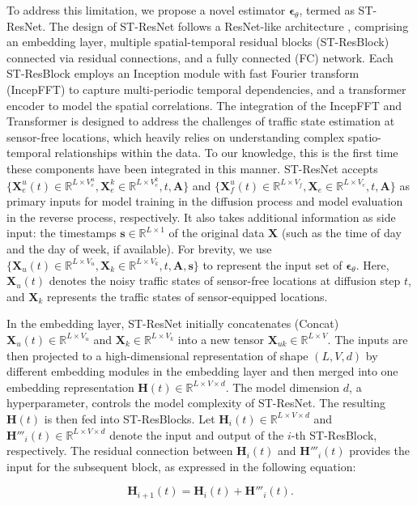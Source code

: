 \documentclass[a4paper,fleqn,12pt]{cas-sc}
\newcommand{\rev}[1]{{\color{red} #1}}
\begin{document}
To address this limitation, we propose a novel estimator $\boldsymbol{\epsilon}_{\theta}$, termed as ST-ResNet. The design of ST-ResNet follows a ResNet-like architecture \citep{wu2019wider}, comprising an embedding layer, multiple spatial-temporal residual blocks (ST-ResBlock) connected via residual connections, and a fully connected (FC) network. Each ST-ResBlock employs an Inception module with fast Fourier transform (IncepFFT) to capture multi-periodic temporal dependencies, and a transformer encoder to model the spatial correlations. \rev{The integration of the IncepFFT and Transformer is designed to address the challenges of traffic state estimation at sensor-free locations, which heavily relies on understanding complex spatio-temporal relationships within the data. To our knowledge, this is the first time these components have been integrated in this manner.} ST-ResNet accepts $\{\boldsymbol{X}^{u}_{e}(t)\in\mathbb{R}^{L\times V_{e}^{u}}, \boldsymbol{X}^{k}_{e}\in\mathbb{R}^{L\times V_{e}^{k}}, t, \boldsymbol{A}\}$ and $\{\boldsymbol{X}^{u}_{f}(t)\in\mathbb{R}^{L\times V_{f}}, \boldsymbol{X}_{e}\in\mathbb{R}^{L\times V_{e}}, t, \boldsymbol{A}\}$ as primary inputs for model training in the diffusion process and model evaluation in the reverse process, respectively. It also takes additional information as side input: the timestamps $\boldsymbol{s}\in\mathbb{R}^{L\times 1}$ of the original data $\boldsymbol{X}$ (such as the time of day and the day of week, if available). For brevity, we use $\{\boldsymbol{X}_{u}(t)\in\mathbb{R}^{L\times V_{u}}, \boldsymbol{X}_{k}\in\mathbb{R}^{L\times V_{k}}, t, \boldsymbol{A}, \boldsymbol{s}\}$ to represent the input set of $\boldsymbol{\epsilon}_{\theta}$. Here, $\boldsymbol{X}_{u}(t)$ denotes the noisy traffic states of sensor-free locations at diffusion step $t$, and $\boldsymbol{X}_{k}$ represents the traffic states of sensor-equipped locations.

In the embedding layer, ST-ResNet initially concatenates (Concat) $\boldsymbol{X}_{u}(t)\in\mathbb{R}^{L\times V_{u}}$ and $\boldsymbol{X}_{k}\in\mathbb{R}^{L\times V_{k}}$ into a new tensor $\boldsymbol{X}_{uk}\in\mathbb{R}^{L\times V}$. The inputs are then projected to a high-dimensional representation of shape $(L, V, d)$ by different embedding modules in the embedding layer and then merged into one embedding representation $\boldsymbol{H}(t)\in\mathbb{R}^{L\times V\times d}$. The model dimension $d$, a hyperparameter, controls the model complexity of ST-ResNet. The resulting $\boldsymbol{H}(t)$ is then fed into ST-ResBlocks. Let $\boldsymbol{H}_{i}(t)\in\mathbb{R}^{L\times V\times d}$ and $\boldsymbol{H}'''_{i}(t)\in\mathbb{R}^{L\times V\times d}$ denote the input and output of the $i$-th ST-ResBlock, respectively. The residual connection between $\boldsymbol{H}_{i}(t)$ and $\boldsymbol{H}'''_{i}(t)$ provides the input for the subsequent block, as expressed in the following equation:
\begin{linenomath*}
\begin{equation}
\boldsymbol{H}_{i+1}(t) = \boldsymbol{H}_{i}(t) + \boldsymbol{H}'''_{i}(t).
\end{equation}
\end{linenomath*}
\end{document}
